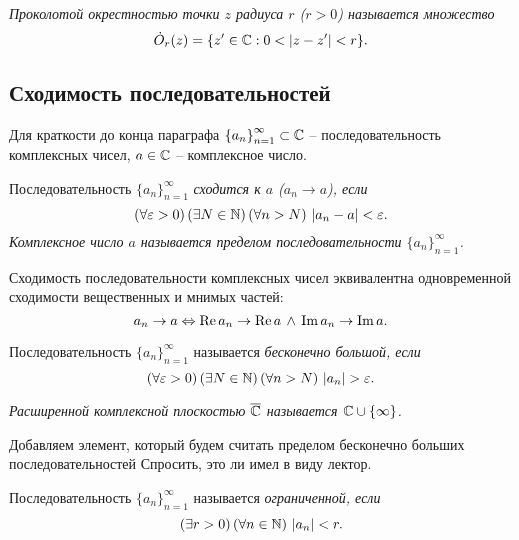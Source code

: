 \begin{definition}
	\it{Проколотой окрестностью} точки $z$ радиуса $r$ ($r > 0$) называется множество
	\[
		{\dot O}_r(z) = \mathopen{}\left\{ z' \in \mathbb{C}: 0 < \mathopen{}\left\lvert z - z'\right\rvert\mathclose{} < r \right\}\mathclose{}.
	\]
\end{definition}

\subsection{Сходимость последовательностей}

Для краткости до конца параграфа ${\{ a_n \}}_{n = 1}^\infty \subset \mathbb{C}$ -- последовательность комплексных чисел, $a \in \mathbb{C}$ -- комплексное число.

\begin{definition}
	Последовательность ${\{ a_n \}}_{n = 1}^\infty$ \it{сходится} к $a$ ($a_n \to a$), если
	\[
		(\forall \varepsilon > 0) \, (\exists N \in \mathbb{N}) \, (\forall n > N) \,\, \mathopen{}\left\lvert a_n - a\right\rvert\mathclose{} < \varepsilon.
	\]
	Комплексное число $a$ называется пределом последовательности ${\{ a_n \}}_{n = 1}^\infty$.
\end{definition}

\begin{note}
	Сходимость последовательности комплексных чисел эквивалентна одновременной сходимости вещественных и мнимых частей:
	\[
		a_n \to a \Leftrightarrow \operatorname{Re} a_n \to \operatorname{Re} a \,\land\, \operatorname{Im} a_n \to \operatorname{Im} a.
	\] 
\end{note}

\begin{definition}
	Последовательность ${\{ a_n \}}_{n = 1}^\infty$ называется \it{бесконечно большой}, если
	\[
		(\forall \varepsilon > 0) \, (\exists N \in \mathbb{N}) \, (\forall n > N) \,\, \mathopen{}\left\lvert a_n\right\rvert\mathclose{} > \varepsilon.
	\]
\end{definition}

\begin{definition}
	\it{Расширенной комплексной плоскостью} $\overline {\mathbb{C}}$ называется $\mathbb{C} \cup \{ \infty \}$.
\end{definition}
\begin{anote}
	Добавляем элемент, который будем считать пределом бесконечно больших последовательностей {\color{red} Спросить, это ли имел в виду лектор.}
\end{anote}

\begin{definition}
	Последовательность ${\{ a_n \}}_{n = 1}^\infty$ называется \it{ограниченной}, если
	\[
		(\exists r > 0) \, (\forall n \in \mathbb{N}) \,\, \mathopen{}\left\lvert a_n\right\rvert\mathclose{} < r.
	\]
\end{definition}

